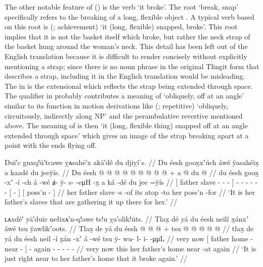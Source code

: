 The other notable feature of (\lastx) is the verb  ‘it broke’.
The root  ‘break, snap’ specifically refers to the breaking of a long, flexible object \parencite[780]{leer:1976}.
A typical verb based on this root is  (; achievement) ‘it (long, flexible) snapped, broke’.
This root implies that it is not the basket itself which broke, but rather the neck strap of the basket hung around the woman’s neck.
This detail has been left out of the English translation because it is difficult to render concisely without explicitly mentioning a strap; since there is no noun phrase in the original Tlingit form that describes a strap, including it in the English translation would be misleading.
The  in  is the extensional which reflects the strap being extended through space.
The  qualifier in  probably contributes a meaning of ‘obliquely, off at an angle’ similar to its function in motion derivations like  (;  repetitive) ‘obliquely, circuitously, indirectly along NP’ and the perambulative revertive mentioned above.
The meaning of  is then ‘it (long, flexible thing) snapped off at an angle extended through space’ which gives an image of the strap breaking apart at a point with the ends flying off.

\ex\label{ex:89-8-slaves-picked-up}%
%
\begingl
	\glpreamble	Duī′c guxq!ū′tcawe ỵᴀsahē′x akā′dê du djiỵîˈs. //
	\glpreamble	Du éesh goox̱xʼúch áwé ÿasahéix̱ a kaadé du jeeÿís. //
	\gla	{} Du éesh  @ {} @ {} @ {} {}
		 @ {}
		 @ {} @ {} @ {} @ {} @ {} +
		{} a  @ {} {}
		{} du  @ {} {} //
	\glb	{} du éesh goox̱ -xʼ -í -ch {}
		á -wé
		ⱥ- ÿ- s-  -eμH -x̱
		{} a ká -dé {}
		{} du jee =ÿís {} //
	\glc	{}[  father slave - - - {}]
		 -
		- - -  - -
		{}[   - {}]
		{}[  poss’n - {}] //
	\gld	{} her father slave -s -of {} {}
		 {}
		 {} {} {} {} {}
		{} its atop -to {}
		{} her poss’n -for {} //
	\glft	‘It is her father’s slaves that are gathering it up there for her.’
		//
\endgl
\xe

\ex\label{ex:89-9-broke-again}%
%
\begingl
	\glpreamble	ʟᴀxdê′ yā′duīc nełixᴀ′n-q!awe ts!u ỵa′olik!ūts. //
	\glpreamble	Tlax̱ dé yá du éesh neilí x̱ánxʼ áwé tsu ÿawlikʼoots. //
	\gla	Tlax̱ de
		{} yá du éesh  @ {}  @ {} {}
		 @ {} +
		tsu  @ {} @ {} @ {} @ {} @ {} //
	\glb	tlax̱ de
		{} yá du éesh neil -í x̱án -xʼ {}
		á -wé
		tsu ÿ- wu- l- i-  -μμL //
	\glc	very now
		{}[   father home - near - {}]
		 -
		again - - - -  - //
	\gld	very now
		{} this her father’s home {} near -at {}
		 {}
		again  {} {} {} {} {} //
	\glft	‘It is just right near to her father’s home that it broke again.’
		//
\endgl
\xe

